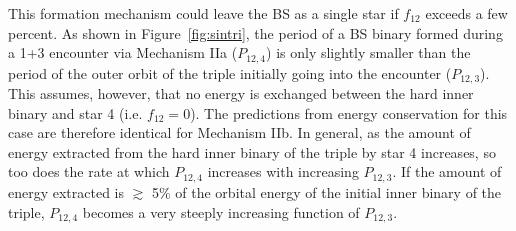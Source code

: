\begin{enumerate}
This formation mechanism could leave the BS as a single star if 
$f_{12}$ exceeds a few percent.  As shown in
Figure~\ref{fig:sintri}, the period of a BS binary formed 
during a 1+3 encounter via Mechanism IIa ($P_{12,4}$) is only slightly
smaller than the period of the outer orbit of the triple initially
going into the encounter ($P_{12,3}$).  This assumes, however, that no
energy is exchanged between the hard inner binary and star 4
(i.e. $f_{12} = 0$).  The
predictions from energy conservation for this case are therefore
identical for Mechanism IIb.  In
general, as the amount of energy extracted from the hard inner binary
of the triple by star 4 increases, so too does the rate at
which $P_{12,4}$ increases with increasing $P_{12,3}$.  
If the amount of energy extracted is $\gtrsim$ 5\% of the orbital
energy of the initial inner binary of the triple, $P_{12,4}$ becomes a
very steeply increasing function of $P_{12,3}$.  


\end{enumerate}
